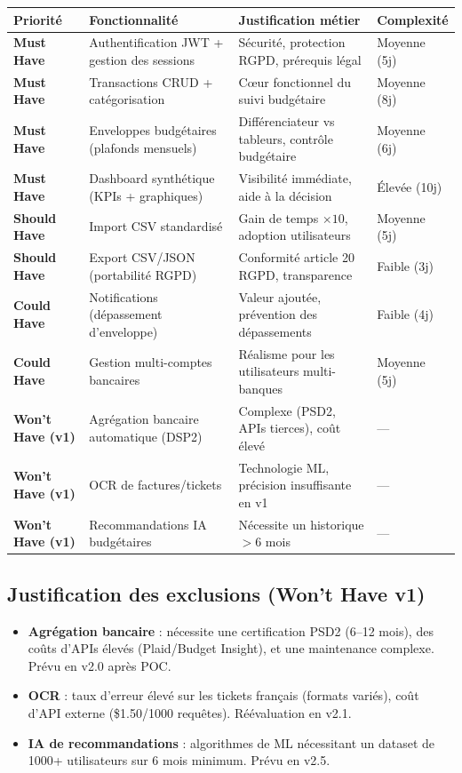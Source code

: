 \begin{center}
\small
\begin{tabular}{|p{2.5cm}|p{4cm}|p{4.5cm}|p{2cm}|}
\hline
\textbf{Priorité} & \textbf{Fonctionnalité} & \textbf{Justification métier} & \textbf{Complexité} \\
\hline
\textbf{Must Have} & Authentification JWT + gestion des sessions & Sécurité, protection RGPD, prérequis légal & Moyenne (5j) \\
\hline
\textbf{Must Have} & Transactions CRUD + catégorisation & Cœur fonctionnel du suivi budgétaire & Moyenne (8j) \\
\hline
\textbf{Must Have} & Enveloppes budgétaires (plafonds mensuels) & Différenciateur vs tableurs, contrôle budgétaire & Moyenne (6j) \\
\hline
\textbf{Must Have} & Dashboard synthétique (KPIs + graphiques) & Visibilité immédiate, aide à la décision & Élevée (10j) \\
\hline
\textbf{Should Have} & Import CSV standardisé & Gain de temps $\times 10$, adoption utilisateurs & Moyenne (5j) \\
\hline
\textbf{Should Have} & Export CSV/JSON (portabilité RGPD) & Conformité article 20 RGPD, transparence & Faible (3j) \\
\hline
\textbf{Could Have} & Notifications (dépassement d'enveloppe) & Valeur ajoutée, prévention des dépassements & Faible (4j) \\
\hline
\textbf{Could Have} & Gestion multi-comptes bancaires & Réalisme pour les utilisateurs multi-banques & Moyenne (5j) \\
\hline
\textbf{Won't Have (v1)} & Agrégation bancaire automatique (DSP2) & Complexe (PSD2, APIs tierces), coût élevé & --- \\
\hline
\textbf{Won't Have (v1)} & OCR de factures/tickets & Technologie ML, précision insuffisante en v1 & --- \\
\hline
\textbf{Won't Have (v1)} & Recommandations IA budgétaires & Nécessite un historique $> 6$ mois & --- \\
\hline
\end{tabular}
\end{center}

\subsection{Justification des exclusions (Won't Have v1)}

\begin{itemize}
  \item \textbf{Agrégation bancaire} : nécessite une certification PSD2 (6--12 mois), des coûts d'APIs élevés (Plaid/Budget Insight), et une maintenance complexe. Prévu en v2.0 après POC.
  \item \textbf{OCR} : taux d'erreur élevé sur les tickets français (formats variés), coût d'API externe (\$1.50/1000 requêtes). Réévaluation en v2.1.
  \item \textbf{IA de recommandations} : algorithmes de ML nécessitant un dataset de 1000+ utilisateurs sur 6 mois minimum. Prévu en v2.5.
\end{itemize}

